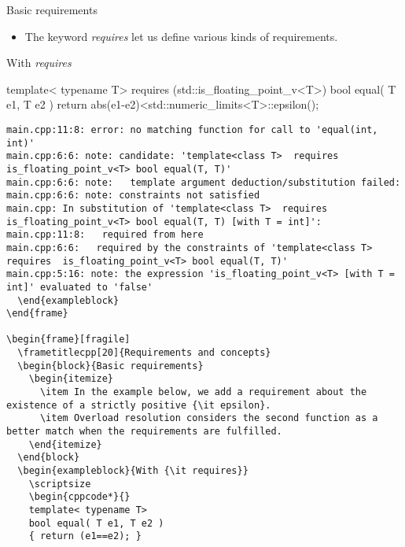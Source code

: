 \begin{frame}[fragile]
  \begin{block}{Basic requirements}
    \begin{itemize}
      \item The keyword {\it requires} let us define various kinds of requirements.
    \end{itemize}
  \end{block}
  \begin{exampleblock}{With {\it requires}}
    \scriptsize
    \begin{cppcode*}{}
    template< typename T>
    requires (std::is_floating_point_v<T>)
    bool equal( T e1, T e2 )
    { return abs(e1-e2)<std::numeric_limits<T>::epsilon(); }
    \end{cppcode*}
    \tiny
    \begin{verbatim}
main.cpp:11:8: error: no matching function for call to 'equal(int, int)'
main.cpp:6:6: note: candidate: 'template<class T>  requires  is_floating_point_v<T> bool equal(T, T)'
main.cpp:6:6: note:   template argument deduction/substitution failed:
main.cpp:6:6: note: constraints not satisfied
main.cpp: In substitution of 'template<class T>  requires  is_floating_point_v<T> bool equal(T, T) [with T = int]':
main.cpp:11:8:   required from here
main.cpp:6:6:   required by the constraints of 'template<class T>  requires  is_floating_point_v<T> bool equal(T, T)'
main.cpp:5:16: note: the expression 'is_floating_point_v<T> [with T = int]' evaluated to 'false'
  \end{exampleblock}
\end{frame}

\begin{frame}[fragile]
  \frametitlecpp[20]{Requirements and concepts}
  \begin{block}{Basic requirements}
    \begin{itemize}
      \item In the example below, we add a requirement about the existence of a strictly positive {\it epsilon}.
      \item Overload resolution considers the second function as a better match when the requirements are fulfilled.
    \end{itemize}
  \end{block}
  \begin{exampleblock}{With {\it requires}}
    \scriptsize
    \begin{cppcode*}{}
    template< typename T>
    bool equal( T e1, T e2 )
    { return (e1==e2); }


\end{verbatim}
\end{exampleblock}
\end{frame}
